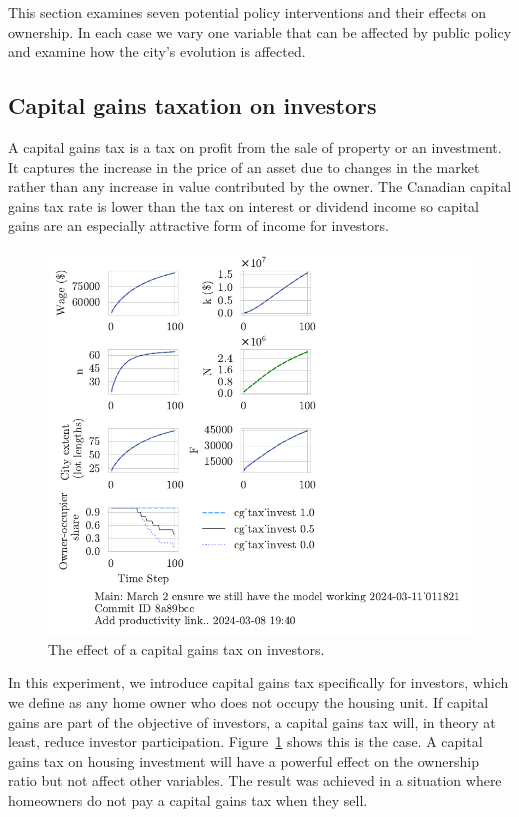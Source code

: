This section examines seven potential policy interventions and their effects on ownership. In each case we vary one variable that can be affected by public policy and examine how the city's evolution is affected.


\newpage

\subsection{Capital gains taxation on investors}
A \gls{capital gains tax} is a tax on profit from the sale of property or an investment. It captures the increase in the price of an asset due to changes in the market rather than any increase in value contributed by the owner. The Canadian capital gains tax rate is lower than the tax on interest or dividend income so capital gains are an especially attractive form of income for investors.

\begin{figure}[hb]
    \centering
    \includegraphics[scale=1.1, trim={0 1.4cm 4cm 0},clip]{fig/cg_tax_invest-Main-011821.pdf}
    \caption{The effect of a capital gains tax on investors.}
    \label{fig:CGinvest_ownership_trajectory}
\end{figure}


In this experiment, we introduce capital gains tax specifically for investors, which we define as any home owner who does not occupy the housing unit. If capital gains are part of the objective of investors, a capital gains tax will, in theory at least, reduce investor participation. Figure~\ref{fig:CGinvest_ownership_trajectory} shows this is the case. A capital gains tax on housing investment will have a powerful effect on the ownership ratio but not affect other variables. The result was achieved in a situation where homeowners do not pay a capital gains tax when they sell. 



